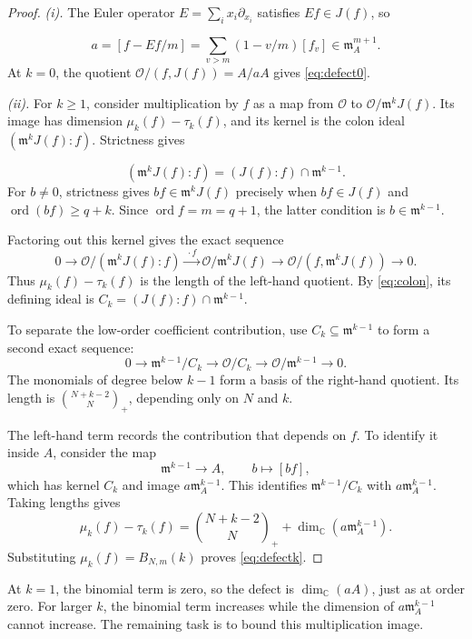 \documentclass[12pt,reqno]{amsart}
\newcommand{\C}{\mathbb C}
\newcommand{\mm}{\mathfrak m}
\newcommand{\ord}{\operatorname{ord}}
\newcommand{\tbin}[2]{\binom{#1}{#2}_{\!+}}
\newcommand{\OO}{\mathcal O}
\theoremstyle{definition}
\begin{document}
\begin{proof}
\emph{(i).}
The Euler operator $E=\sum_i x_i\partial_{x_i}$ satisfies
$Ef\in J(f)$, so

\begin{equation}\label{eq:eulerclass}
 a=[f-Ef/m]=\sum_{v>m}(1-v/m)[f_v]\in\mm_A^{m+1}.
\end{equation}
At $k=0$, the quotient $\OO/(f,J(f))=A/aA$ gives
\eqref{eq:defect0}.

\emph{(ii).}
For $k\geq1$, consider multiplication by $f$ as a map from $\OO$ to
$\OO/\mm^kJ(f)$. Its image has dimension $\mu_k(f)-\tau_k(f)$,
and its kernel is the colon ideal $(\mm^kJ(f):f)$. Strictness gives

\begin{equation}\label{eq:colon}
 (\mm^kJ(f):f)=(J(f):f)\cap\mm^{k-1}.
\end{equation}
For $b\ne0$, strictness gives
$bf\in\mm^kJ(f)$ precisely when $bf\in J(f)$ and
$\ord(bf)\geq q+k$. Since $\ord f=m=q+1$, the latter
condition is $b\in\mm^{k-1}$.


Factoring out this kernel gives the exact sequence
\[
 0\longrightarrow \OO/(\mm^kJ(f):f)
 \xrightarrow{\ \cdot f\ }\OO/\mm^kJ(f)
 \longrightarrow \OO/(f,\mm^kJ(f))\longrightarrow0.
\]
Thus $\mu_k(f)-\tau_k(f)$ is the length of the left-hand quotient.
By \eqref{eq:colon}, its defining ideal is
$C_k=(J(f):f)\cap\mm^{k-1}$.

To separate the low-order coefficient contribution, use
$C_k\subseteq\mm^{k-1}$ to form a second exact sequence:
\[
 0\longrightarrow\mm^{k-1}/C_k
   \longrightarrow \OO/C_k
   \longrightarrow \OO/\mm^{k-1}\longrightarrow0.
\]
The monomials of degree below $k-1$ form a basis of the right-hand
quotient. Its length is $\tbin{N+k-2}{N}$, depending
only on $N$ and $k$.

The left-hand term records the contribution that depends on $f$.
To identify it inside $A$, consider the map
\[
 \mm^{k-1}\longrightarrow A,\qquad b\longmapsto[bf],
\]
which has kernel $C_k$ and image $a\mm_A^{k-1}$.
This identifies $\mm^{k-1}/C_k$ with $a\mm_A^{k-1}$. Taking
lengths gives
\[
 \mu_k(f)-\tau_k(f)
 =\tbin{N+k-2}{N}+\dim_\C(a\mm_A^{k-1}).
\]
Substituting $\mu_k(f)=B_{N,m}(k)$ proves \eqref{eq:defectk}.
\end{proof}

 
At $k=1$, the binomial term is zero, so the defect is $\dim_\C(aA)$,
just as at order zero. For larger $k$, the binomial term increases
while the dimension of $a\mm_A^{k-1}$ cannot increase. The remaining
task is to bound this multiplication image.
\end{document}
